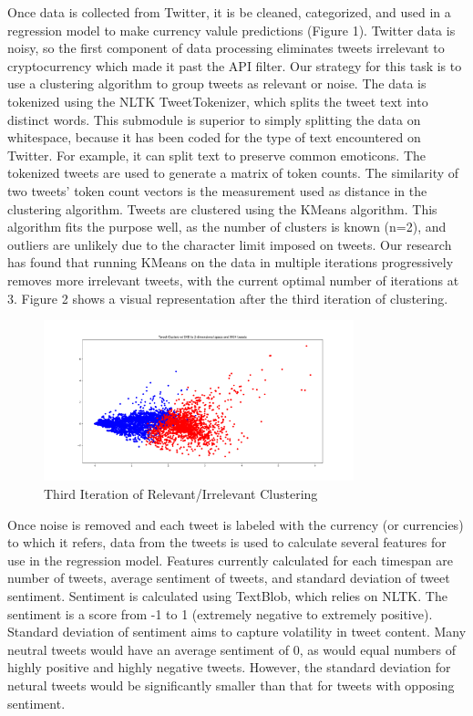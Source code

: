 \documentclass[sigconf]{acmart}
\begin{document}
Once data is collected from Twitter, it is be cleaned, categorized, and used in a regression model to make currency valule predictions (Figure 1). Twitter data is noisy, so the first component of data processing eliminates tweets irrelevant to cryptocurrency which made it past the API filter. Our strategy for this task is to use a clustering algorithm to group tweets as relevant or noise. The data is tokenized using the NLTK TweetTokenizer, which splits the tweet text into distinct words. This submodule is superior to simply splitting the data on whitespace, because it has been coded for the type of text encountered on Twitter. For example, it can split text to preserve common emoticons. The tokenized tweets are used to generate a matrix of token counts. The similarity of two tweets' token count vectors is the measurement used as distance in the clustering algorithm. Tweets are clustered using the KMeans algorithm. This algorithm fits the purpose well, as the number of clusters is known (n=2), and outliers are unlikely due to the character limit imposed on tweets. Our research has found that running KMeans on the data in multiple iterations progressively removes more irrelevant tweets, with the current optimal number of iterations at 3. Figure 2 shows a visual representation after the third iteration of clustering.

\begin{figure}[H]
\caption{Third Iteration of Relevant/Irrelevant Clustering}
\includegraphics[width=9cm]{3pass.png}
\end{figure}

Once noise is removed and each tweet is labeled with the currency (or currencies) to which it refers, data from the tweets is used to calculate several features for use in the regression model. Features currently calculated for each timespan are number of tweets, average sentiment of tweets, and standard deviation of tweet sentiment. Sentiment is calculated using TextBlob, which relies on NLTK. The sentiment is a score from -1 to 1 (extremely negative to extremely positive). Standard deviation of sentiment aims to capture volatility in tweet content. Many neutral tweets would have an average sentiment of 0, as would equal numbers of highly positive and highly negative tweets. However, the standard deviation for netural tweets would be significantly smaller than that for tweets with opposing sentiment. 
\end{document}
